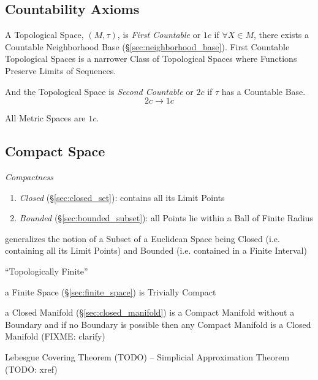 \subsection{Countability Axioms}\label{sec:countability_axioms}

A Topological Space, $(M,\tau)$, is \emph{First Countable} or $1c$ if
$\forall X \in M$, there exists a Countable Neighborhood Base
(\S\ref{sec:neighborhood_base}). First Countable Topological Spaces is
a narrower Class of Topological Spaces where Functions Preserve Limits
of Sequences. %

And the Topological Space is \emph{Second Countable} or $2c$ if $\tau$
has a Countable Base.
\[
  2c \rightarrow 1c
\]

All Metric Spaces are $1c$.



\subsection{Compact Space}\label{sec:compact_space}

\emph{Compactness}

\begin{enumerate}
\item \emph{Closed} (\S\ref{sec:closed_set}): contains all its Limit Points
\item \emph{Bounded} (\S\ref{sec:bounded_subset}): all Points lie within a Ball
  of Finite Radius
\end{enumerate}

generalizes the notion of a Subset of a Euclidean Space being Closed
(i.e. containing all its Limit Points) and Bounded (i.e. contained in
a Finite Interval)

``Topologically Finite''

a Finite Space (\S\ref{sec:finite_space}) is Trivially Compact

\fist a Closed Manifold (\S\ref{sec:closed_manifold}) is a Compact Manifold
without a Boundary and if no Boundary is possible then any Compact Manifold
is a Closed Manifold (FIXME: clarify)

Lebesgue Covering Theorem (TODO) -- Simplicial Approximation Theorem (TODO:
xref)



